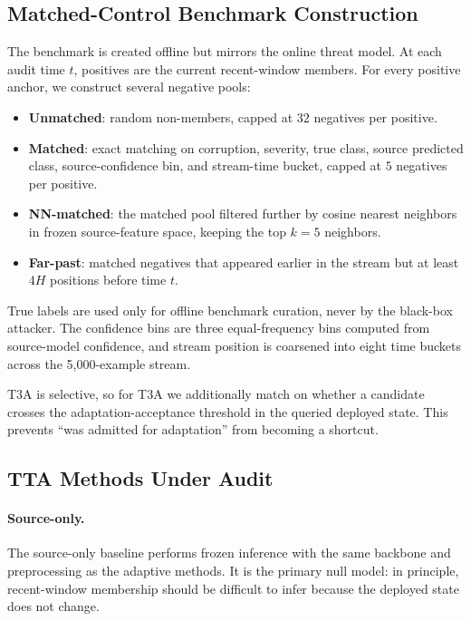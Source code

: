 \subsection{Matched-Control Benchmark Construction}

The benchmark is created offline but mirrors the online threat model. At each audit time $t$, positives are the current recent-window members. For every positive anchor, we construct several negative pools:
\begin{itemize}
  \item \textbf{Unmatched}: random non-members, capped at $32$ negatives per positive.
  \item \textbf{Matched}: exact matching on corruption, severity, true class, source predicted class, source-confidence bin, and stream-time bucket, capped at $5$ negatives per positive.
  \item \textbf{NN-matched}: the matched pool filtered further by cosine nearest neighbors in frozen source-feature space, keeping the top $k=5$ neighbors.
  \item \textbf{Far-past}: matched negatives that appeared earlier in the stream but at least $4H$ positions before time $t$.
\end{itemize}

True labels are used only for offline benchmark curation, never by the black-box attacker. The confidence bins are three equal-frequency bins computed from source-model confidence, and stream position is coarsened into eight time buckets across the 5{,}000-example stream.

T3A is selective, so for T3A we additionally match on whether a candidate crosses the adaptation-acceptance threshold in the queried deployed state. This prevents ``was admitted for adaptation'' from becoming a shortcut.

\subsection{TTA Methods Under Audit}

\paragraph{Source-only.}
The source-only baseline performs frozen inference with the same backbone and preprocessing as the adaptive methods. It is the primary null model: in principle, recent-window membership should be difficult to infer because the deployed state does not change.

